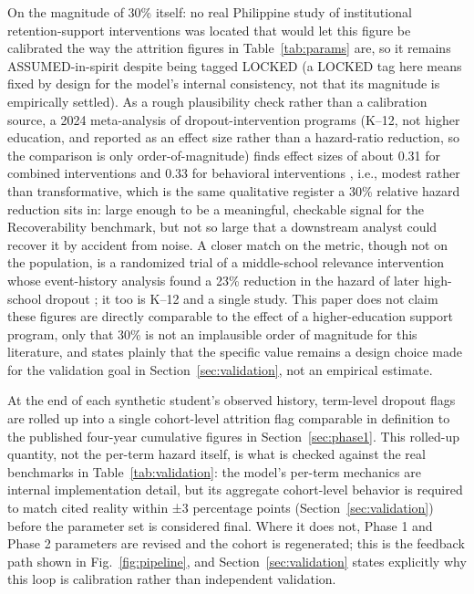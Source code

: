 \documentclass[11pt]{article}
\begin{document}
On the magnitude of 30\% itself: no real Philippine study of institutional retention-support interventions was located that would let this figure be calibrated the way the attrition figures in Table~\ref{tab:params} are, so it remains ASSUMED-in-spirit despite being tagged LOCKED (a LOCKED tag here means fixed by design for the model's internal consistency, not that its magnitude is empirically settled). As a rough plausibility check rather than a calibration source, a 2024 meta-analysis of dropout-intervention programs (K--12, not higher education, and reported as an effect size rather than a hazard-ratio reduction, so the comparison is only order-of-magnitude) finds effect sizes of about 0.31 for combined interventions and 0.33 for behavioral interventions \citep{wang2024meta}, i.e., modest rather than transformative, which is the same qualitative register a 30\% relative hazard reduction sits in: large enough to be a meaningful, checkable signal for the Recoverability benchmark, but not so large that a downstream analyst could recover it by accident from noise. A closer match on the metric, though not on the population, is a randomized trial of a middle-school relevance intervention whose event-history analysis found a 23\% reduction in the hazard of later high-school dropout \citep{rose2021careerstart}; it too is K--12 and a single study. This paper does not claim these figures are directly comparable to the effect of a higher-education support program, only that 30\% is not an implausible order of magnitude for this literature, and states plainly that the specific value remains a design choice made for the validation goal in Section~\ref{sec:validation}, not an empirical estimate.

At the end of each synthetic student's observed history, term-level dropout flags are rolled up into a single cohort-level attrition flag comparable in definition to the published four-year cumulative figures in Section~\ref{sec:phase1}. This rolled-up quantity, not the per-term hazard itself, is what is checked against the real benchmarks in Table~\ref{tab:validation}: the model's per-term mechanics are internal implementation detail, but its aggregate cohort-level behavior is required to match cited reality within ±3 percentage points (Section~\ref{sec:validation}) before the parameter set is considered final. Where it does not, Phase 1 and Phase 2 parameters are revised and the cohort is regenerated; this is the feedback path shown in Fig.~\ref{fig:pipeline}, and Section~\ref{sec:validation} states explicitly why this loop is calibration rather than independent validation.
\end{document}
